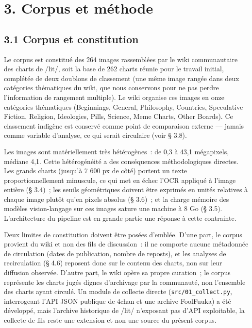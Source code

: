 \documentclass[11pt,a4paper]{article}
\begin{document}
\section*{3. Corpus et méthode}

\subsection*{3.1 Corpus et constitution}

Le corpus est constitué des 264 images rassemblées par le wiki communautaire des charts de /lit/, soit la base de 262 charts réunie pour le travail initial, complétée de deux doublons de classement (une même image rangée dans deux catégories thématiques du wiki, que nous conservons pour ne pas perdre l'information de rangement multiple). Le wiki organise ces images en onze catégories thématiques (Beginnings, General, Philosophy, Countries, Speculative Fiction, Religion, Ideologies, Pills, Science, Meme Charts, Other Boards). Ce classement indigène est conservé comme point de comparaison externe --- jamais comme variable d'analyse, ce qui serait circulaire (voir § 3.8).

Les images sont matériellement très hétérogènes~: de 0,3 à 43,1 mégapixels, médiane 4,1. Cette hétérogénéité a des conséquences méthodologiques directes. Les grands charts (jusqu'à 7 600 px de côté) portent un texte proportionnellement minuscule, ce qui met en échec l'OCR appliqué à l'image entière (§ 3.4)~; les seuils géométriques doivent être exprimés en unités relatives à chaque image plutôt qu'en pixels absolus (§ 3.6)~; et la charge mémoire des modèles vision-langage sur ces images sature une machine à 8 Go (§ 3.5). L'architecture du pipeline est en grande partie une réponse à cette contrainte.

Deux limites de constitution doivent être posées d'emblée. D'une part, le corpus provient du wiki et non des fils de discussion~: il ne comporte aucune métadonnée de circulation (dates de publication, nombre de reposts), et les analyses de recirculation (§ 4.6) reposent donc sur le contenu des charts, non sur leur diffusion observée. D'autre part, le wiki opère sa propre curation~; le corpus représente les charts jugés dignes d'archivage par la communauté, non l'ensemble des charts ayant circulé. Un module de collecte directe (\texttt{src/01\_collect.py}, interrogeant l'API JSON publique de 4chan et une archive FoolFuuka) a été développé, mais l'archive historique de /lit/ n'exposant pas d'API exploitable, la collecte de fils reste une extension et non une source du présent corpus.
\end{document}
